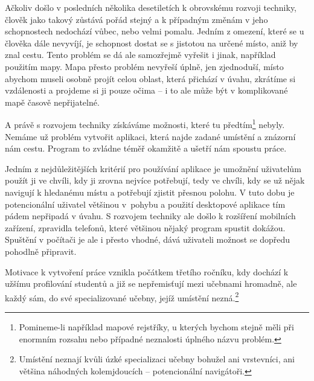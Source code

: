 
Ačkoliv došlo v posledních několika desetiletích k obrovskému rozvoji techniky, člověk jako takový zůstává pořád stejný a k případným změnám v jeho schopnostech nedochází vůbec, nebo velmi pomalu. Jedním z omezení, které se u člověka dále nevyvíjí, je schopnost dostat se s jistotou na určené místo, aniž by znal cestu. Tento problém se dá ale samozřejmě vyřešit i jinak, například použitím mapy. Mapa přesto problém nevyřeší úplně, jen zjednoduší, místo abychom museli osobně projít celou oblast, která přichází v úvahu, zkrátíme si vzdálenosti a projdeme si ji pouze očima -- i to ale může být v komplikované mapě časově nepřijatelné.

A právě s rozvojem techniky získáváme možnosti, které tu předtím\footnote{Pomineme-li například mapové rejstříky, u kterých bychom stejně měli při enormním rozsahu nebo případné neznalosti úplného názvu problém.} nebyly. Nemáme už problém vytvořit aplikaci, která najde zadané umístění a znázorní nám cestu. Program to zvládne téměř okamžitě a ušetří nám spoustu práce.

Jedním z nejdůležitějších kritérií pro používání aplikace je umožnění uživatelům použít ji ve chvíli, kdy ji zrovna nejvíce potřebují, tedy ve chvíli, kdy se už nějak navigují k hledanému místu a potřebují zjistit přesnou polohu. V tuto dobu je potencionální uživatel většinou v~pohybu a použití desktopové aplikace tím pádem nepřipadá v úvahu. S rozvojem techniky ale došlo k rozšíření mobilních zařízení, zpravidla telefonů, které většinou nějaký program spustit dokážou. Spuštění v počítači je ale i přesto vhodné, dává uživateli možnost se dopředu pohodlně připravit.

Motivace k vytvoření práce vznikla počátkem třetího ročníku, kdy dochází k užšímu profilování studentů a již se nepřemisťují mezi učebnami hromadně, ale každý sám, do své specializované učebny, jejíž umístění nezná.\footnote{Umístění neznají kvůli úzké specializaci učebny bohužel ani vrstevníci, ani většina náhodných kolemjdoucích -- potencionální navigátoři.}
